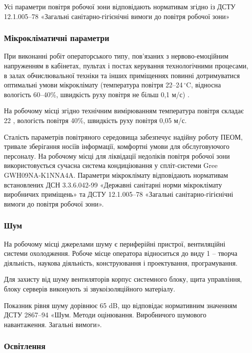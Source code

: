 \documentclass[a4paper,ukrainian,utf8,nocolumnsxix,floatsection,equationsection]{eskdtext}
\renewcommand\paragraph{\subsubsection}
\begin{document}
Усі параметри повітря робочої зони відповідають нормативам згідно із  ДСТУ 12.1.005–78 «Загальні санітарно-гігієнічні вимоги до повітря робочої зони»

\paragraph{Мікрокліматичні параметри}

При виконанні робіт операторського типу, пов'язаних з нервово-емоційним напруженням в кабінетах, пультах і постах керування технологічними процесами, в залах обчислювальної техніки та інших приміщеннях повинні дотримуватися оптимальні умови мікроклімату (температура повітря 22–24$\,^{\circ}\mathrm{C}$, відносна вологість 60–40\%, швидкість руху повітря не більш 0,1 м/с) \cite{work:safety:17}.

На робочому місці згідно технічним вимірюванням температура повітря складає 22 , вологість повітря 40\%, швидкість руху повітря 0,05 м/с.

Сталість параметрів повітряного середовища забезпечує надійну роботу ПЕОМ, тривале зберігання носіїв інформації, комфортні умови для обслуговуючого персоналу. На робочому місці для ліквідації недоліків повітря робочої зони використовується сучасна система кондиціювання у спліт-системи Gree GWH09NA-K1NNA4A. Параметри мікроклімату відповідають нормативам встановлених ДСН 3.3.6.042-99 «Державні санітарні норми мікроклімату виробничих приміщень» та ДСТУ 12.1.005–78 «Загальні санітарно-гігієнічні вимоги до повітря робочої зони».

\paragraph{Шум}

На робочому місці джерелами шуму є периферійні пристрої, вентиляційні системи охолодження. Робоче місце оператора відноситься до виду 1 – творча діяльність, наукова діяльність, конструювання і проектування, програмування.

Для захисту від шуму вентиляторів корпус системного блоку, щита управління, блоку серверів виконують зі звукоізоляційного матеріалу. 

Показник рівня шуму дорівнює 65 dB, що відповідає нормативним значенням ДСТУ 2867–94 «Шум. Методи оцінювання. Виробничого шумового навантаження. Загальні вимоги».

\paragraph{Освітлення}
\end{document}
